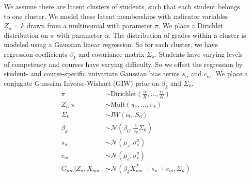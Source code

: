 \documentclass[10pt]{proc}
\begin{document}
We assume there are latent clusters of students, such that each student belongs
to one cluster. We model these latent memberships with indicator variables
$Z_n = k$ drawn from a multinomial with parameter $\pi$. We place a Dirichlet
distribution on $\pi$ with parameter $\alpha$. The distribution of grades within
a cluster is modeled using a Gaussian linear regression. So for each cluster, we
have regression coefficients $\beta_k$ and covariance matrix $\Sigma_k$.
Students have varying levels of competency and courses have varying difficulty.
So we offset the regression by student- and course-specific univariate Gaussian
bias terms $s_n$ and $c_m$. We place a conjugate Guassian Inverse-Wishart (GIW)
prior on $\beta_k$ and $\Sigma_k$.
%
\begin{align}
    \pi &\sim \text{Dirichlet}\left(
        \frac{\alpha}{K}, ..., \frac{\alpha}{K}
    \right)  \\
    Z_n | \pi &\sim \text{Mult}\left(
        \pi_1, ..., \pi_k
    \right)  \\
    \Sigma_k &\sim IW\left(
        \nu_0, S_0
    \right)  \\
    \beta_k &\sim \mathcal{N}\left(
        \beta_0, \frac{1}{\kappa_0} \Sigma_k
    \right)  \\
    s_n &\sim \mathcal{N}\left(
        \mu_s, \sigma_s^2
    \right)  \\
    c_m &\sim \mathcal{N}\left(
        \mu_c, \sigma_c^2
    \right)  \\
    G_{nm} | Z_n, X_{mn} &\sim \mathcal{N}\left(
        \beta_k X_{nm}^T + s_n + c_m, \Sigma_k
    \right)
\end{align}
\end{document}
